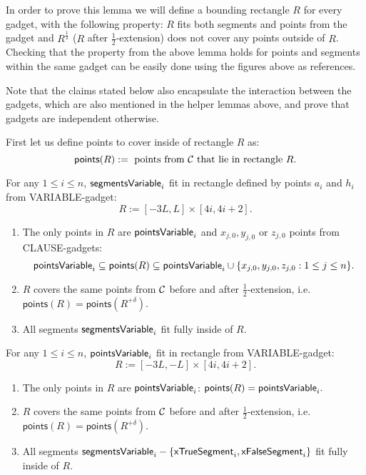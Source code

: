 In order to prove this lemma we will define 
a bounding rectangle $R$
for every gadget,
with the following property:
$R$ fits both segments and points from the
gadget and $R^{\frac{1}{2}}$ ($R$ after $\frac{1}{2}$-extension)
does not cover any points outside of $R$.
Checking that the property from the above
lemma holds for points and segments within the same gadget
can be easily done using the figures above as references.


Note that the claims stated below also encapsulate the interaction
between the gadgets,
which are also mentioned in the helper lemmas above,
and prove that gadgets are independent otherwise. 

\newcommand{\pointsIn}{\mathsf{points}}
First let us define points to cover inside of rectangle $R$ as:
$$\pointsIn(R) :=  \text{ points from } \points
\text{ that lie in rectangle } R.$$
 

\begin{claim}
\label{claim:variable_bounding_rectangle}
For any $1 \le i \le n$, $\mathsf{segmentsVariable}_{i}$ fit in rectangle 
defined by points $a_i$ and $h_i$ from VARIABLE-gadget:
$$R := [-3L,L] \times [4i,4i+2].$$
\begin{enumerate}[label={(\arabic*)}]
\item 
The only points in $R$ are $\mathsf{pointsVariable}_{i}$
and $x_{j,0}, y_{j,0}$ or $z_{j,0}$ points 
from CLAUSE-gadgets:
$$\pointsVar{i} \subseteq \pointsIn(R) \subseteq \pointsVar{i} \cup
\{x_{j,0}, y_{j,0}, z_{j,0}: 1 \le j \le n\}.$$
\item 
$R$ covers the same points from $\mathcal{C}$
before and after $\frac{1}{2}$-extension, i.e.
$\pointsIn(R) = \pointsIn(R^{+\delta})$.
\item All segments $\mathsf{segmentsVariable}_{i}$ fit fully inside of $R$.
\end{enumerate}
\end{claim}

\begin{claim}
\label{claim:variable_small_bounding_rectangle}
For any $1 \le i \le n$, $\mathsf{pointsVariable}_{i}$ fit in rectangle 
from VARIABLE-gadget:
$$R := [-3L,-L] \times [4i,4i+2].$$
\begin{enumerate}[label={(\arabic*)}]
\item 
The only points in $R$ are $\mathsf{pointsVariable}_{i}$:
$\pointsIn(R) = \pointsVar{i}.$
\item 
$R$ covers the same points from $\mathcal{C}$
before and after $\frac{1}{2}$-extension, i.e.
$\pointsIn(R) = \pointsIn(R^{+\delta})$.
\item All segments $\mathsf{segmentsVariable}_{i} - \{\mathsf{xTrueSegment}_{i}, \mathsf{xFalseSegment}_{i}\}$ 
fit fully inside of $R$.
\end{enumerate}
\end{claim}

